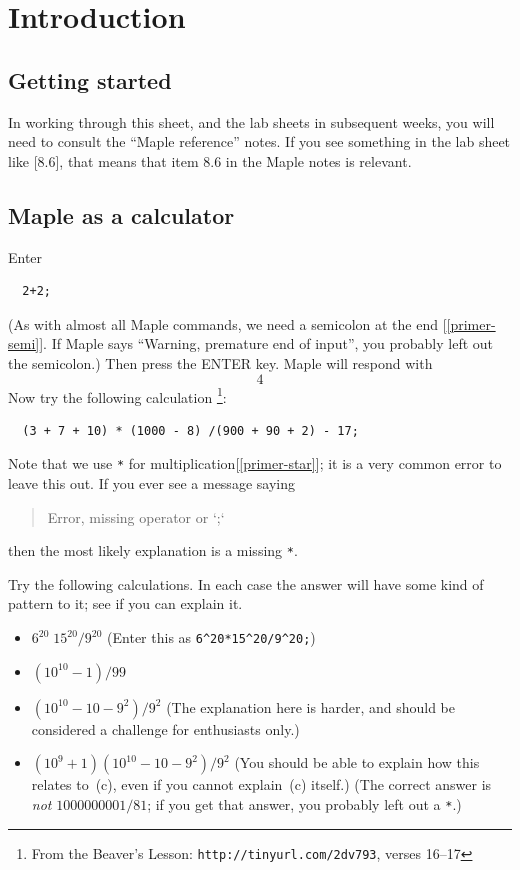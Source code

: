 \documentclass[a4paper,10pt]{amsbook}
\begin{document}
\chapter{Introduction}

\section{Getting started}

In working through this sheet, and the lab sheets in subsequent weeks,
you will need to consult the ``Maple reference'' notes.  If you see
something in the lab sheet like [8.6], that means that item 8.6
in the Maple notes is relevant.

\section{Maple as a calculator}

\begin{exercise}\label{ex-twoplustwo}
 Enter
\begin{verbatim}
  2+2;
\end{verbatim}
 (As with almost all Maple commands, we need a semicolon at
 the end [\ref{primer-semi}].  If Maple says ``Warning,
 premature end of input'', you probably left out the
 semicolon.)  Then press the ENTER key.  Maple will respond
 with
 \[ 4 \]
 Now try the following calculation%
 \footnote{From the Beaver's Lesson:
 \verb~http://tinyurl.com/2dv793~,
 verses 16--17}:
\begin{verbatim}
  (3 + 7 + 10) * (1000 - 8) /(900 + 90 + 2) - 17;
\end{verbatim}
 Note that we use \verb~*~ for
 multiplication[\ref{primer-star}]; it is a very common error to 
 leave this out.  If you ever see a message saying
 \begin{quotation}
  Error, missing operator or `;` 
 \end{quotation}
 then the most likely explanation is a missing \verb~*~.  
\end{exercise}

\begin{exercise}\label{ex-numeric-misc}
 Try the following calculations.  In each case the answer will have
 some kind of pattern to it; see if you can explain it. 
 \begin{itemize}
  \item[(a)] $6^{20}\;15^{20}/9^{20}$ (Enter this as
   \verb~6^20*15^20/9^20;~) 
  \item[(b)] $(10^{10}-1)/99$
  \item[(c)] $(10^{10}-10-9^2)/9^2$ (The explanation here is
   harder, and should be considered a challenge for enthusiasts only.)  
  \item[(d)] $(10^9+1)(10^{10}-10-9^2)/9^2$ (You should be able to
   explain how this relates to~(c), even if you cannot explain~(c)
   itself.)  (The correct answer is \emph{not}
   $1000000001/81$; if you get that answer, you probably
   left out a \verb~*~.) 
 \end{itemize}
\end{exercise}
\end{document}
